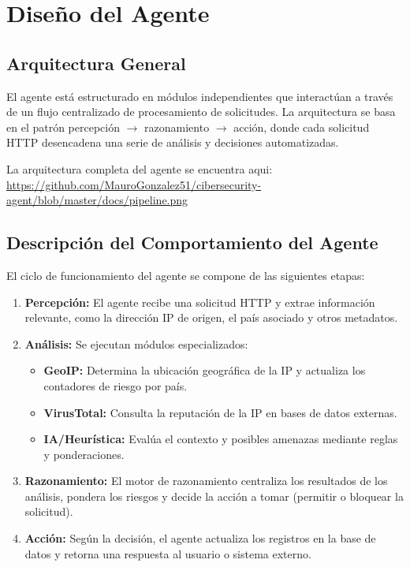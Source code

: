 \section{Diseño del Agente}

\subsection{Arquitectura General}

El agente está estructurado en módulos independientes que interactúan a través de un flujo centralizado de procesamiento de solicitudes. La arquitectura se basa en el patrón percepción $\rightarrow$ razonamiento $\rightarrow$ acción, donde cada solicitud HTTP desencadena una serie de análisis y decisiones automatizadas.

La arquitectura completa del agente se encuentra aqui:\\ \url{https://github.com/MauroGonzalez51/cibersecurity-agent/blob/master/docs/pipeline.png}

\subsection{Descripción del Comportamiento del Agente}

El ciclo de funcionamiento del agente se compone de las siguientes etapas:

\begin{enumerate}
    \item \textbf{Percepción:} El agente recibe una solicitud HTTP y extrae información relevante, como la dirección IP de origen, el país asociado y otros metadatos.
    \item \textbf{Análisis:} Se ejecutan módulos especializados:
    \begin{itemize}
        \item \textbf{GeoIP:} Determina la ubicación geográfica de la IP y actualiza los contadores de riesgo por país.
        \item \textbf{VirusTotal:} Consulta la reputación de la IP en bases de datos externas.
        \item \textbf{IA/Heurística:} Evalúa el contexto y posibles amenazas mediante reglas y ponderaciones.
    \end{itemize}
    \item \textbf{Razonamiento:} El motor de razonamiento centraliza los resultados de los análisis, pondera los riesgos y decide la acción a tomar (permitir o bloquear la solicitud).
    \item \textbf{Acción:} Según la decisión, el agente actualiza los registros en la base de datos y retorna una respuesta al usuario o sistema externo.
\end{enumerate}

